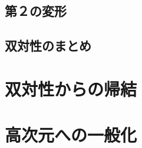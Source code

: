\documentclass[a4paper,12pt,dvipdfmx]{jlreq}
\begin{document}
\subsection{第２の変形}



\subsection{双対性のまとめ}

\section{双対性からの帰結}

\section{高次元への一般化}

\printbibliography
\end{document}
